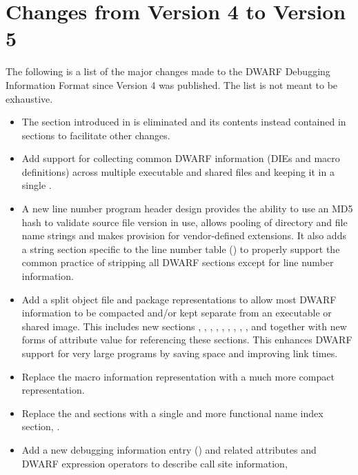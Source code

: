 \section{Changes from Version 4 to Version 5}
The following is a list of the major changes made to the DWARF Debugging Information
Format since Version 4 was published. The list is not meant to be exhaustive.
\begin{itemize}
\item The \dotdebugtypes{}
section introduced in \DWARFVersionIV{} 
is eliminated and its contents instead contained in \dotdebuginfo{} sections
to facilitate other changes.
\item Add support for collecting common DWARF information (DIEs and macro definitions)
across multiple executable and shared files and keeping it in a single
.
\item A new line number program header design provides the ability to 
use an MD5 hash to validate source file version in use, allows pooling 
of directory and file name strings and makes provision for vendor-defined
extensions. It also adds a string section specific to the line number table 
(\dotdebuglinestr)
to properly support the common practice of stripping all DWARF sections
except for line number information.
\item Add a split object file and package representations to allow most 
DWARF information to be compacted and/or kept separate from an executable 
or shared image. This includes new sections 
\dotdebugaddr, \dotdebugstroffsets, \dotdebugabbrevdwo, \dotdebuginfodwo, 
\dotdebuglinedwo, \dotdebuglocdwo, \dotdebugmacrodwo, \dotdebugstrdwo,
\dotdebugstroffsetsdwo, \dotdebugcuindex{} and \dotdebugtuindex{} 
together with new forms of attribute value for referencing these sections.
This enhances DWARF support for very large programs by saving space 
and improving link times.
\item Replace the \dotdebugmacinfo{} macro information representation with
a much more compact \dotdebugmacro{} representation.
\item Replace the \dotdebugpubnames{} and \dotdebugpubtypes{} sections
with a single and more functional name index section, \dotdebugnames{}.
\item Add a new debugging information entry (\DWTAGcallsiteNAME) and related 
attributes and DWARF expression operators to describe call site information, 

\end{itemize}
